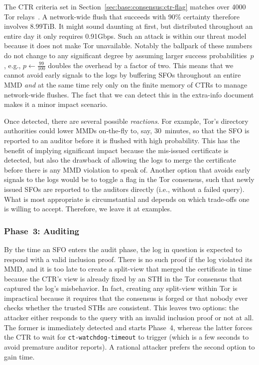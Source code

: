 The CTR criteria set in Section~\ref{sec:base:consensus:ctr-flag} matches over
4000 Tor relays~\cite{relay-by-flag}.  A network-wide flush that succeeds with
90\% certainty therefore involves 8.99TiB.  It might sound daunting at
first, but distributed throughout an entire day it only requires
0.91Gbps.
Such an attack is within our threat model because it does not make Tor
unavailable.  Notably the ballpark of these numbers do not change to any
significant degree by assuming larger success probabilities~$p$, e.g.,
$p\gets\frac{99}{100}$ doubles the overhead by a factor of two.  This means that
we cannot avoid early signals to the logs by buffering SFOs throughout an entire
MMD \emph{and} at the same time rely only on the finite memory of CTRs to manage
network-wide flushes.  The fact that we can detect this in the extra-info
document makes it a minor impact scenario.

Once detected, there are several possible \emph{reactions}.  For example, Tor's
directory authorities could lower MMDs on-the-fly to, say, 30~minutes, so that
the SFO is reported to an auditor before it is flushed with high
probability.  This has the benefit of implying significant impact because
the mis-issued certificate is detected, but also the drawback of allowing the
logs to merge the certificate before there is any MMD violation to speak of.
Another option that avoids early signals to the logs would be to toggle a
flag in the Tor consensus, such that newly issued SFOs are reported to the
auditors directly (i.e., without a failed query).  What is most appropriate
is circumstantial and depends on which trade-offs one is willing to accept.
Therefore, we leave it at examples.

\subsubsection{Phase~3: Auditing} \label{sec:analysis:pr:phase3}
By the time an SFO enters the audit phase, the log in question is expected to
respond with a valid inclusion proof.  There is no such proof if the log
violated its MMD, and it is too late to create a split-view that merged the
certificate in time because the CTR's view is already fixed by an STH in the
Tor consensus that captured the log's misbehavior.  In fact, creating any
split-view within Tor is impractical because it requires that the consensus is
forged or that nobody ever checks whether the trusted STHs are consistent.
This leaves two options:
	the attacker either responds to the query with an invalid inclusion proof or
	not at all.
The former is immediately detected and starts Phase~4, whereas the latter forces
the CTR to wait for \texttt{ct-watchdog-timeout} to trigger (which is a
few seconds to avoid premature auditor reports).  A rational attacker prefers
the second option to gain time.

